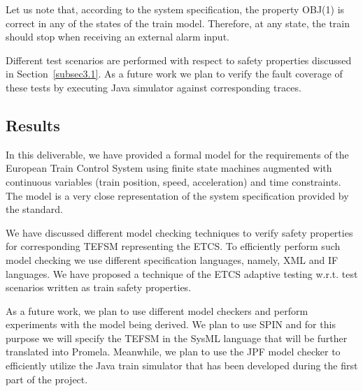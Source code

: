 \documentclass{template/openetcs_article}
\begin{document}
Let us note that, according to the system specification, the property OBJ(1) is correct in any of the states of the train model. Therefore, at any state, the train should stop when receiving an external alarm input.

Different test scenarios are performed with respect to safety properties discussed in Section~\ref{subsec3.1}. As a future work we plan to verify the fault coverage of these tests by executing Java simulator against corresponding traces.


\subsection*{Results}

In this deliverable, we have provided a formal model for the requirements of the European Train Control System using finite state machines augmented with continuous variables (train position, speed, acceleration) and time constraints. The model is a very close representation of the system specification provided by the standard.

We have discussed different model checking techniques to verify safety properties for corresponding TEFSM representing the ETCS. To efficiently perform such model checking we use different specification languages, namely, XML and IF languages.
%
We have proposed a technique of the ETCS adaptive testing w.r.t. test scenarios written as train safety properties. 

As a future work, we plan to use different model checkers and perform experiments with the model being derived. We plan to use SPIN and for this purpose we will specify the TEFSM in the SysML language that will be further translated into Promela. Meanwhile, we plan to use the JPF model checker to efficiently utilize the Java train simulator that has been developed during the first part of the project.

\nocite{*}

%



%
\end{document}
